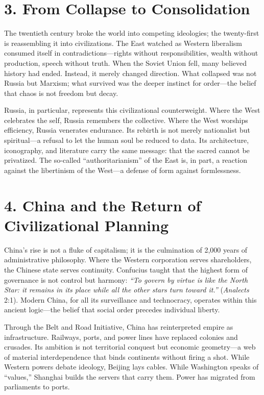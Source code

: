 \documentclass[11pt,twoside]{book}
\begin{document}
\section*{3. From Collapse to Consolidation}

The twentieth century broke the world into competing ideologies; the twenty-first is reassembling it into civilizations.  
The East watched as Western liberalism consumed itself in contradictions—rights without responsibilities, wealth without production, speech without truth.  
When the Soviet Union fell, many believed history had ended.  
Instead, it merely changed direction.  
What collapsed was not Russia but Marxism; what survived was the deeper instinct for order—the belief that chaos is not freedom but decay.

Russia, in particular, represents this civilizational counterweight.  
Where the West celebrates the self, Russia remembers the collective.  
Where the West worships efficiency, Russia venerates endurance.  
Its rebirth is not merely nationalist but spiritual—a refusal to let the human soul be reduced to data.  
Its architecture, iconography, and literature carry the same message: that the sacred cannot be privatized.  
The so-called “authoritarianism” of the East is, in part, a reaction against the libertinism of the West—a defense of form against formlessness.

\section*{4. China and the Return of Civilizational Planning}

China’s rise is not a fluke of capitalism; it is the culmination of 2,000 years of administrative philosophy.  
Where the Western corporation serves shareholders, the Chinese state serves continuity.  
Confucius taught that the highest form of governance is not control but harmony:  
\textit{“To govern by virtue is like the North Star: it remains in its place while all the other stars turn toward it.”}  
(\textit{Analects} 2:1).  
Modern China, for all its surveillance and technocracy, operates within this ancient logic—the belief that social order precedes individual liberty.

Through the Belt and Road Initiative, China has reinterpreted empire as infrastructure.  
Railways, ports, and power lines have replaced colonies and crusades.  
Its ambition is not territorial conquest but economic geometry—a web of material interdependence that binds continents without firing a shot.  
While Western powers debate ideology, Beijing lays cables.  
While Washington speaks of “values,” Shanghai builds the servers that carry them.  
Power has migrated from parliaments to ports.
\end{document}

